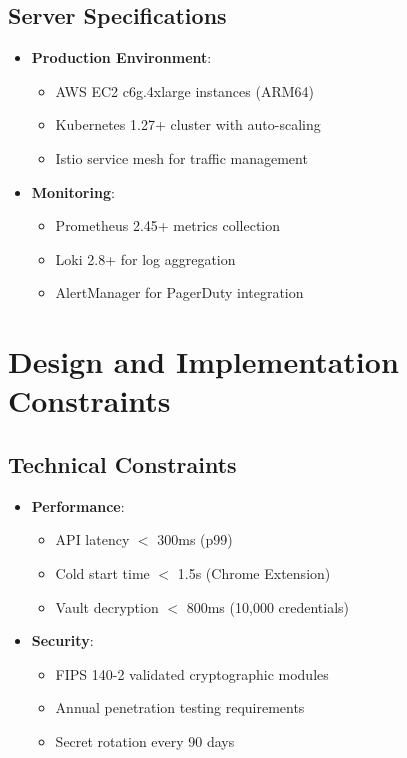 \documentclass{scrreprt}
\begin{document}
\subsection{Server Specifications}
\begin{itemize}
    \item \textbf{Production Environment}:
    \begin{itemize}
        \item AWS EC2 c6g.4xlarge instances (ARM64)
        \item Kubernetes 1.27+ cluster with auto-scaling
        \item Istio service mesh for traffic management
    \end{itemize}
    
    \item \textbf{Monitoring}:
    \begin{itemize}
        \item Prometheus 2.45+ metrics collection
        \item Loki 2.8+ for log aggregation
        \item AlertManager for PagerDuty integration
    \end{itemize}
\end{itemize}

\section{Design and Implementation Constraints}
\label{sec:design-constraints}

\subsection{Technical Constraints}
\begin{itemize}
    \item \textbf{Performance}:
    \begin{itemize}
        \item API latency $<$ 300ms (p99)
        \item Cold start time $<$ 1.5s (Chrome Extension)
        \item Vault decryption $<$ 800ms (10,000 credentials)
    \end{itemize}
    
    \item \textbf{Security}:
    \begin{itemize}
        \item FIPS 140-2 validated cryptographic modules
        \item Annual penetration testing requirements
        \item Secret rotation every 90 days
    \end{itemize}
\end{itemize}
\end{document}
